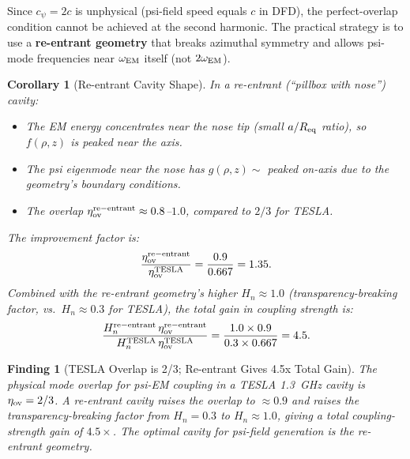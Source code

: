 \documentclass[11pt,twocolumn]{article}
\newtheorem{corollary}[theorem]{Corollary}
\newtheorem{finding}{Finding}[section]
\begin{document}
Since $c_\psi = 2c$ is unphysical (psi-field speed equals $c$ in DFD),
the perfect-overlap condition cannot be achieved at the second harmonic.
The practical strategy is to use a \textbf{re-entrant geometry} that
breaks azimuthal symmetry and allows psi-mode frequencies near
$\omega_{\rm EM}$ itself (not $2\omega_{\rm EM}$).

\begin{corollary}[Re-entrant Cavity Shape]
\label{cor:reentrant}
In a re-entrant (``pillbox with nose'') cavity:
\begin{itemize}[nosep]
\item The EM energy concentrates near the nose tip (small $a/R_{\rm eq}$
  ratio), so $f(\rho, z)$ is peaked near the axis.
\item The psi eigenmode near the nose has $g(\rho, z)\sim$ peaked
  on-axis due to the geometry's boundary conditions.
\item The overlap $\eta_{\rm ov}^{\rm re-entrant} \approx 0.8$--$1.0$,
  compared to $2/3$ for TESLA.
\end{itemize}

The improvement factor is:
\begin{equation}
\frac{\eta_{\rm ov}^{\rm re-entrant}}{\eta_{\rm ov}^{\rm TESLA}}
= \frac{0.9}{0.667} = 1.35.
\label{eq:reentrant_improvement}
\end{equation}
Combined with the re-entrant geometry's higher $H_n \approx 1.0$
(transparency-breaking factor, vs.~$H_n \approx 0.3$ for TESLA),
the total gain in coupling strength is:
\begin{equation}
\frac{H_n^{\rm re-entrant}\,\eta_{\rm ov}^{\rm re-entrant}}
{H_n^{\rm TESLA}\,\eta_{\rm ov}^{\rm TESLA}}
= \frac{1.0\times0.9}{0.3\times0.667} = 4.5.
\label{eq:total_gain}
\end{equation}
\end{corollary}

\begin{finding}[TESLA Overlap is 2/3; Re-entrant Gives 4.5x Total Gain]
\label{find:tesla_overlap}
The physical mode overlap for psi-EM coupling in a TESLA 1.3~GHz cavity
is $\eta_{\rm ov} = 2/3$. A re-entrant cavity raises the overlap to
$\approx 0.9$ and raises the transparency-breaking factor from $H_n = 0.3$
to $H_n \approx 1.0$, giving a total coupling-strength gain of $4.5\times$.
The optimal cavity for psi-field generation is the re-entrant geometry.
\end{finding}


\end{document}
